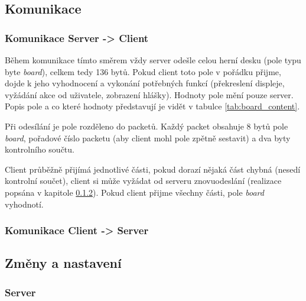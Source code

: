 \documentclass[a4paper,12pt, twoside]{article} %
\begin{document}
\subsection{Komunikace}
\subsubsection{Komunikace Server -> Client}
\label{sec:komunikace_server_client}
Během komunikace tímto směrem vždy server odešle celou herní desku (pole typu byte \textit{board}), celkem tedy 136 bytů. Pokud client toto pole v pořádku přijme, dojde k jeho vyhodnocení a vykonání potřebných funkcí (překreslení displeje, vyžádání akce od uživatele, zobrazení hlášky). Hodnoty pole mění pouze server. Popis pole a co které hodnoty představují je vidět v tabulce \ref{tab:board_content}. 

Při odesílání je pole rozděleno do packetů. Každý packet obsahuje 8 bytů pole \textit{board}, pořadové číslo packetu (aby client mohl pole zpětně sestavit) a dva byty kontrolního součtu. 

Client průběžně přijímá jednotlivé části, pokud dorazí nějaká část chybná (nesedí kontrolní součet), client si může vyžádat od serveru znovuodeslání (realizace popsána v kapitole \ref{sec:komunikace_client_server}). Pokud client přijme všechny části, pole \textit{board} vyhodnotí.

%
\subsubsection{Komunikace Client -> Server}
\label{sec:komunikace_client_server}
\subsection{Změny a nastavení}
\subsubsection{Server}
\label{sec:nastaveni_server}
\clearpage
\end{document}
